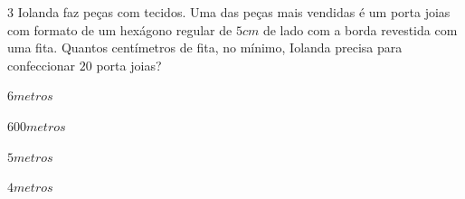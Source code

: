 








\num{3} Iolanda faz peças com tecidos. Uma das peças mais vendidas é um porta
joias com formato de um hexágono regular de $5 cm$ de lado com a borda
revestida com uma fita. Quantos centímetros de fita, no mínimo, Iolanda
precisa para confeccionar $20$ porta joias?

\begin{escolha}
\item $6 metros$ 
\item $600 metros$
\item $5 metros$
\item $4 metros$
\end{escolha}









